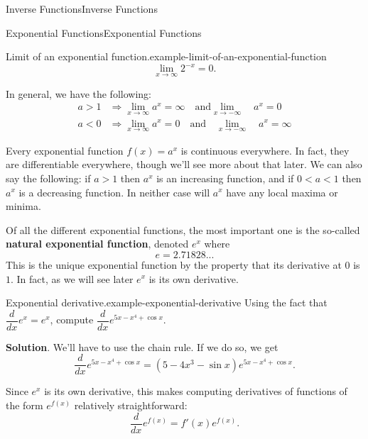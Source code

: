 \documentclass[10pt,]{book}
\newcommand{\terminology}[1]{\textbf{#1}}
\numberwithin{equation}{section}
\newcommand{\dv}[3][]{\dfrac{d^{#1} #2}{d #3^{#1}}}
\begin{document}
\begin{chapterptx}{Inverse Functions}{}{Inverse Functions}{}{}
\begin{sectionptx}{Exponential Functions}{}{Exponential Functions}{}{}
\begin{example}{Limit of an exponential function.}{example-limit-of-an-exponential-function}
\begin{equation*}
\lim_{x\to\infty}2^{-x} = 0.
\end{equation*}
%
\end{example}
\hypertarget{p-190}{}%
In general, we have the following:%
\begin{align*}
a > 1 & \Rightarrow \lim_{x\to\infty}a^{x} = \infty\quad\text{and}\lim_{x\to-\infty}\quad a^{x} = 0 \\
a < 0 & \Rightarrow \lim_{x\to\infty}a^{x} = 0\quad\text{and}\quad\lim_{x\to-\infty}\quad a^{x} = \infty 
\end{align*}
%
\par
\hypertarget{p-191}{}%
Every exponential function \(f(x) = a^{x}\) is continuous everywhere. In fact, they are differentiable everywhere, though we'll see more about that later. We can also say the following: if \(a > 1\) then \(a^{x}\) is an increasing function, and if \(0 < a < 1\) then \(a^{x}\) is a decreasing function. In neither case will \(a^{x}\) have any local maxima or minima.%
\par
\hypertarget{p-192}{}%
Of all the different exponential functions, the most important one is the so-called \terminology{natural exponential function}, denoted \(e^{x}\) where%
\begin{equation*}
e = 2.71828...
\end{equation*}
This is the unique exponential function by the property that its derivative at \(0\) is \(1\). In fact, as we will see later \(e^{x}\) is its own derivative.%
\begin{example}{Exponential derivative.}{example-exponential-derivative}%
\hypertarget{p-193}{}%
Using the fact that \(\dv{}{x}e^{x} = e^{x}\), compute \(\dv{}{x}e^{5x - x^{4} + \cos x}\).%
\par\smallskip%
\noindent\textbf{Solution}.\hypertarget{solution-43}{}\quad%
\hypertarget{p-194}{}%
We'll have to use the chain rule. If we do so, we get%
\begin{equation*}
\dv{}{x}e^{5x - x^{4} + \cos x} = (5 - 4x^{3} - \sin x)e^{5x - x^{4} + \cos x}.
\end{equation*}
%
\end{example}
\hypertarget{p-195}{}%
Since \(e^{x}\) is its own derivative, this makes computing derivatives of functions of the form \(e^{f(x)}\) relatively straightforward:%
\begin{equation*}
\dv{}{x}e^{f(x)} = f'(x)e^{f(x)}.
\end{equation*}
%
\par
\hypertarget{p-196}{}%

\end{sectionptx}
\end{chapterptx}
\end{document}
